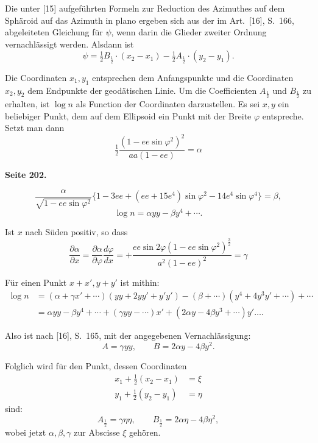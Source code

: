 \documentclass[12pt,a4paper]{article}
\theoremstyle{plain}
\theoremstyle{definition}
\theoremstyle{remark}
\begin{document}
Die unter [15] aufgeführten Formeln zur Reduction des Azimuthes auf dem Sphäroid auf das Azimuth in plano ergeben sich aus der im Art.~[16], S.~166, abgeleiteten Gleichung für $\psi$, wenn darin die Glieder zweiter Ordnung vernachlässigt werden. Alsdann ist
\[
\psi = \tfrac{1}{2} B_{\frac{1}{2}} \cdot (x_2 - x_1) - \tfrac{1}{2} A_{\frac{1}{2}} \cdot (y_2 - y_1).
\]

Die Coordinaten $x_1, y_1$ entsprechen dem Anfangspunkte und die Coordinaten $x_2, y_2$ dem Endpunkte der geodätischen Linie. Um die Coefficienten $A_{\frac{1}{2}}$ und $B_{\frac{1}{2}}$ zu erhalten, ist $\log n$ als Function der Coordinaten darzustellen. Es sei $x, y$ ein beliebiger Punkt, dem auf dem Ellipsoid ein Punkt mit der Breite $\varphi$ entspreche. Setzt man dann
\begin{equation}
\tfrac{1}{2} \frac{(1 - ee \sin \varphi^2)^2}{aa(1 - ee)} = \alpha
\end{equation}

\newpage
\textbf{Seite 202.}

\[
\frac{\alpha}{\sqrt{1 - ee \sin \varphi^2}} \{1 - 3ee + (ee + 15e^4) \sin \varphi^2 - 14e^4 \sin \varphi^4\} = \beta,
\]
\[
\log n = \alpha yy - \beta y^4 + \cdots.
\]

Ist $x$ nach Süden positiv, so dass
\[
\frac{\partial \alpha}{\partial x} = \frac{\partial \alpha}{\partial \varphi} \frac{d\varphi}{dx} = +\frac{ee \sin 2\varphi (1 - ee \sin \varphi^2)^{\frac{3}{2}}}{a^2(1 - ee)^2} = \gamma
\]

Für einen Punkt $x + x', y + y'$ ist mithin:
\begin{align*}
\log n &= (\alpha + \gamma x' + \cdots)(yy + 2yy' + y'y') - (\beta + \cdots)(y^4 + 4y^3y' + \cdots) + \cdots \\
&= \alpha yy - \beta y^4 + \cdots + (\gamma yy - \cdots)x' + (2\alpha y - 4\beta y^3 + \cdots)y' \ldots.
\end{align*}

Also ist nach [16], S.~165, mit der angegebenen Vernachlässigung:
\[
A = \gamma yy, \qquad B = 2\alpha y - 4\beta y^2.
\]

Folglich wird für den Punkt, dessen Coordinaten
\begin{align*}
x_1 + \tfrac{1}{2}(x_2 - x_1) &= \xi \\
y_1 + \tfrac{1}{2}(y_2 - y_1) &= \eta
\end{align*}
sind:
\[
A_{\frac{1}{2}} = \gamma \eta\eta, \qquad B_{\frac{1}{2}} = 2\alpha \eta - 4\beta \eta^2,
\]
wobei jetzt $\alpha, \beta, \gamma$ zur Abscisse $\xi$ gehören.
\end{document}
